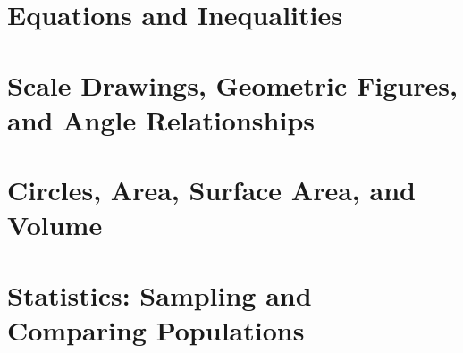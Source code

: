 \documentclass[12pt, fleqn, openany]{studyGuide}
\begin{document}
\chapter{Equations and Inequalities}








\chapter{Scale Drawings, Geometric Figures, and Angle Relationships}








\chapter{Circles, Area, Surface Area, and Volume}








\chapter{Statistics: Sampling and Comparing Populations}
\end{document}
